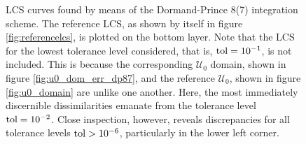 \begin{figure}[htpb]
    \centering
    
    \caption[LCS curves found by means of the Dormand-Prince 8(7) integration
    scheme]{
        LCS curves found by means of the Dormand-Prince 8(7) integration
        scheme. The reference LCS, as shown by itself in figure
        \ref{fig:referencelcs}, is plotted on the bottom layer. Note that
        the LCS for the lowest tolerance level considered, that is,
        $\textnormal{tol}=10^{-1}$, is not included. This is because the
        corresponding $\mathcal{U}_{0}$ domain, shown in figure
        \ref{fig:u0_dom_err_dp87}, and the reference $\mathcal{U}_{0}$, shown in figure
        \ref{fig:u0_domain} are unlike one another. Here, the most immediately
        discernible dissimilarities emanate from the tolerance level
        $\textnormal{tol}=10^{-2}$. Close inspection, however, reveals
        discrepancies for all tolerance levels $\textnormal{tol}>10^{-6}$,
        particularly in the lower left corner.}
    \label{fig:lcs_rkdp87}
\end{figure}
